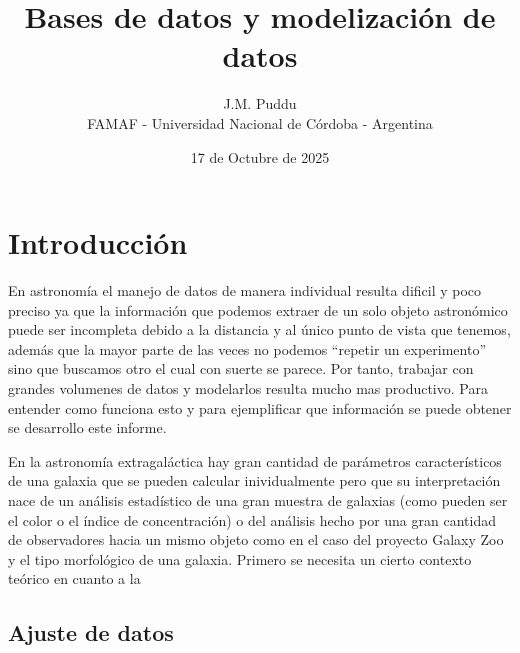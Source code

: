 \documentclass[twocolumn]{article}
\title{Bases de datos y modelización de datos}
\author{J.M. Puddu \\ FAMAF - Universidad Nacional de Córdoba - Argentina}
\date{17 de Octubre de 2025}
\begin{document}

\section{Introducción}

En astronomía el manejo de datos de manera individual resulta dificil y poco preciso ya que la información que podemos extraer de un solo objeto astronómico puede ser incompleta debido a la distancia y al único punto de vista que tenemos, además que la mayor parte de las veces no podemos ``repetir un experimento'' sino que buscamos otro el cual con suerte se parece. 
Por tanto, trabajar con grandes volumenes de datos y modelarlos resulta mucho mas productivo. Para entender como funciona esto y para ejemplificar que información se puede obtener se desarrollo este informe.

En la astronomía extragaláctica hay gran cantidad de parámetros característicos de una galaxia que se pueden calcular inividualmente pero que su interpretación nace de un análisis estadístico de una gran muestra de galaxias (como pueden ser el color o el índice de concentración) o del análisis hecho por una gran cantidad de observadores hacia un mismo objeto como en el caso del proyecto Galaxy Zoo \citep{galaxyzoo} y el tipo morfológico de una galaxia. 
Primero se necesita un cierto contexto teórico en cuanto a la 

\subsection{Ajuste de datos}
\end{document}
